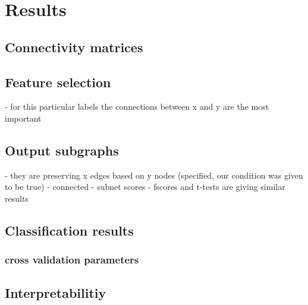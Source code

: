 \documentclass[msthesis.tex]{subfiles}
\begin{document}
\chapter{Results}

\section{Connectivity matrices}

\section{Feature selection}

- for this particular labels the connections between x and y are the most important

\section{Output subgraphs}

- they are preserving x edges based on y nodes (specified, our condition was given to be true)
- connected
- subnet scores
- fscores and t-tests are giving similar results

\section{Classification results}
\subsection{cross validation parameters}


\section{Interpretabilitiy}
\end{document}
